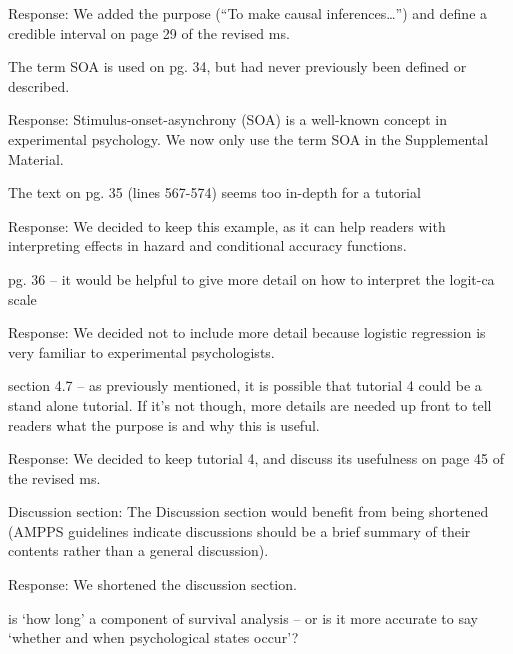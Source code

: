 \documentclass[
]{article}
\renewenvironment{quote}{\begin{leftbar}}{\end{leftbar}}
\begin{document}
Response: We added the purpose (``To make causal inferences\ldots{}'')
and define a credible interval on page 29 of the revised ms.

\begin{quote}
The term SOA is used on pg. 34, but had never previously been defined or
described.
\end{quote}

Response: Stimulus-onset-asynchrony (SOA) is a well-known concept in
experimental psychology. We now only use the term SOA in the
Supplemental Material.

\begin{quote}
The text on pg. 35 (lines 567-574) seems too in-depth for a tutorial
\end{quote}

Response: We decided to keep this example, as it can help readers with
interpreting effects in hazard and conditional accuracy functions.

\begin{quote}
pg. 36 -- it would be helpful to give more detail on how to interpret
the logit-ca scale
\end{quote}

Response: We decided not to include more detail because logistic
regression is very familiar to experimental psychologists.

\begin{quote}
section 4.7 -- as previously mentioned, it is possible that tutorial 4
could be a stand alone tutorial. If it's not though, more details are
needed up front to tell readers what the purpose is and why this is
useful.
\end{quote}

Response: We decided to keep tutorial 4, and discuss its usefulness on
page 45 of the revised ms.

\begin{quote}
Discussion section: The Discussion section would benefit from being
shortened (AMPPS guidelines indicate discussions should be a brief
summary of their contents rather than a general discussion).
\end{quote}

Response: We shortened the discussion section.

\begin{quote}
is `how long' a component of survival analysis -- or is it more accurate
to say `whether and when psychological states occur'?
\end{quote}
\end{document}
